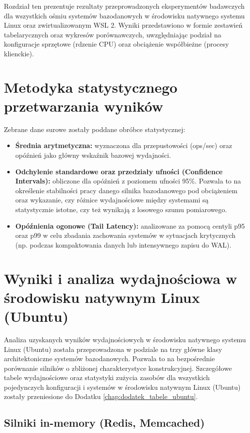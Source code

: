 Rozdział ten prezentuje rezultaty przeprowadzonych eksperymentów badawczych dla wszystkich ośmiu systemów bazodanowych w środowisku natywnego systemu Linux oraz zwirtualizowanym WSL 2. Wyniki przedstawiono w formie zestawień tabelarycznych oraz wykresów porównawczych, uwzględniając podział na konfiguracje sprzętowe (rdzenie CPU) oraz obciążenie współbieżne (procesy klienckie).

\section{Metodyka statystycznego przetwarzania wyników}

Zebrane dane surowe zostały poddane obróbce statystycznej:
\begin{itemize}
    \item \textbf{Średnia arytmetyczna:} wyznaczona dla przepustowości (ops/sec) oraz opóźnień jako główny wskaźnik bazowej wydajności.
    \item \textbf{Odchylenie standardowe oraz przedziały ufności (Confidence Intervals):} obliczone dla opóźnień z poziomem ufności 95\%. Pozwala to na określenie stabilności pracy danego silnika bazodanowego pod obciążeniem oraz wykazanie, czy różnice wydajnościowe między systemami są statystycznie istotne, czy też wynikają z losowego szumu pomiarowego.
    \item \textbf{Opóźnienia ogonowe (Tail Latency):} analizowane za pomocą centyli p95 oraz p99 w celu zbadania zachowania systemów w sytuacjach krytycznych (np. podczas kompaktowania danych lub intensywnego zapisu do WAL).
\end{itemize}

\section{Wyniki i analiza wydajnościowa w środowisku natywnym Linux (Ubuntu)}
\label{sec:wyniki_linux}

Analiza uzyskanych wyników wydajnościowych w środowisku natywnego systemu Linux (Ubuntu) została przeprowadzona w podziale na trzy główne klasy architektoniczne systemów bazodanowych. Pozwala to na bezpośrednie porównanie silników o zbliżonej charakterystyce konstrukcyjnej. Szczegółowe tabele wydajnościowe oraz statystyki zużycia zasobów dla wszystkich pojedynczych konfiguracji i systemów w środowisku natywnym Linux (Ubuntu) zostały przeniesione do Dodatku \ref{chap:dodatek_tabele_ubuntu}.

\subsection{Silniki in-memory (Redis, Memcached)}

